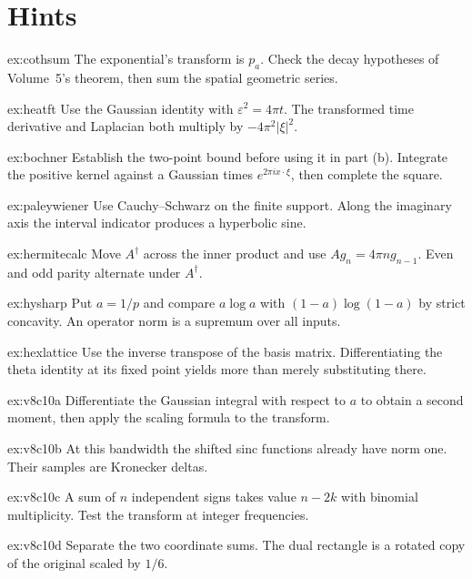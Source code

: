 \section{Hints}

\begin{hint}{ex:cothsum}
The exponential's transform is $p_a$. Check the decay hypotheses of Volume~5's theorem, then sum the spatial geometric series.
\end{hint}
\begin{hint}{ex:heatft}
Use the Gaussian identity with $\varepsilon^2=4\pi t$. The transformed time derivative and Laplacian both multiply by $-4\pi^2|\xi|^2$.
\end{hint}
\begin{hint}{ex:bochner}
Establish the two-point bound before using it in part (b). Integrate the positive kernel against a Gaussian times $e^{2\pi ix\cdot\xi}$, then complete the square.
\end{hint}
\begin{hint}{ex:paleywiener}
Use Cauchy--Schwarz on the finite support. Along the imaginary axis the interval indicator produces a hyperbolic sine.
\end{hint}
\begin{hint}{ex:hermitecalc}
Move $A^\dagger$ across the inner product and use $Ag_n=4\pi ng_{n-1}$. Even and odd parity alternate under $A^\dagger$.
\end{hint}
\begin{hint}{ex:hysharp}
Put $a=1/p$ and compare $a\log a$ with $(1-a)\log(1-a)$ by strict concavity. An operator norm is a supremum over all inputs.
\end{hint}
\begin{hint}{ex:hexlattice}
Use the inverse transpose of the basis matrix. Differentiating the theta identity at its fixed point yields more than merely substituting there.
\end{hint}
\begin{hint}{ex:v8c10a}
Differentiate the Gaussian integral with respect to $a$ to obtain a second moment, then apply the scaling formula to the transform.
\end{hint}
\begin{hint}{ex:v8c10b}
At this bandwidth the shifted sinc functions already have norm one. Their samples are Kronecker deltas.
\end{hint}
\begin{hint}{ex:v8c10c}
A sum of $n$ independent signs takes value $n-2k$ with binomial multiplicity. Test the transform at integer frequencies.
\end{hint}
\begin{hint}{ex:v8c10d}
Separate the two coordinate sums. The dual rectangle is a rotated copy of the original scaled by $1/6$.
\end{hint}

